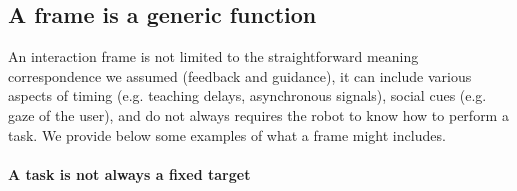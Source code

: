 




\subsection*{A frame is a generic function}
\label{chapter:limitations:framegeneric}

An interaction frame is not limited to the straightforward meaning correspondence we assumed (feedback and guidance), it can include various aspects of timing (e.g. teaching delays, asynchronous signals), social cues (e.g. gaze of the user), and do not always requires the robot to know how to perform a task. We provide below some examples of what a frame might includes.

\paragraph{A task is not always a fixed target}

